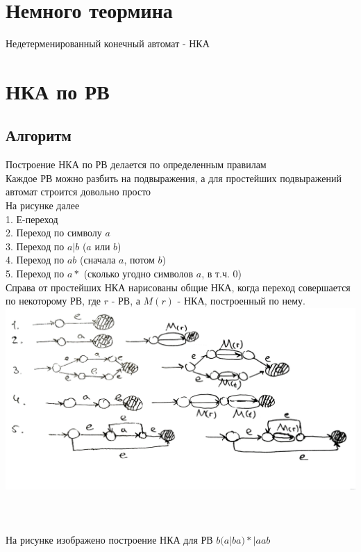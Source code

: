 \documentclass[14pt]{extreport}
\begin{document}
	\chapter{Немного теормина}
	Недетерменированный конечный автомат - НКА
	\newpage
	
	\chapter{НКА по РВ}
	\section{Алгоритм}
	Построение НКА по РВ делается по определенным правилам\\
	Каждое РВ можно разбить на подвыражения, а для простейших подвыражений автомат строится
	довольно просто\\
	На рисунке далее\\
	1. Е-переход\\
	2. Переход по символу $a$\\
	3. Переход по $a|b$ ($a$ или $b$)\\
	4. Переход по $ab$ (сначала $a$, потом $b$)\\
	5. Переход по $a*$ (сколько угодно символов $a$, в т.ч. 0)\\
	Справа от простейших НКА нарисованы общие НКА, когда переход совершается
	по некоторому РВ, где $r$ - РВ, а $M(r)$ - НКА, построенный по нему.\\
	\includegraphics[scale=0.13]{data/pic1_1.png}\\\\\\\\
	На рисунке изображено построение НКА для РВ $b(a|ba)*|aab$\\
\end{document}
